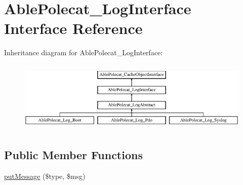 \hypertarget{interface_able_polecat___log_interface}{}\section{Able\+Polecat\+\_\+\+Log\+Interface Interface Reference}
\label{interface_able_polecat___log_interface}
Inheritance diagram for Able\+Polecat\+\_\+\+Log\+Interface\+:\begin{figure}[H]
\begin{center}
\leavevmode
\includegraphics[height=3.409437cm]{interface_able_polecat___log_interface}
\end{center}
\end{figure}
\subsection*{Public Member Functions}
\begin{DoxyCompactItemize}
\item 
\hyperlink{interface_able_polecat___log_interface_a952026c3d234eb84a9f211b17f33a110}{put\+Message} (\$type, \$msg)
\end{DoxyCompactItemize}
